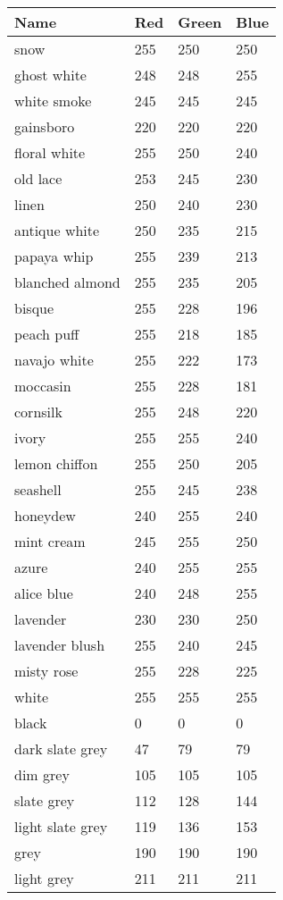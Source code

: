  \begin{center} 
 \begin{tabular}{llll} 
 \toprule 
  Name & Red & Green & Blue  \\ 
 \midrule 
  snow & 255 & 250 & 250  \\
  ghost white & 248 & 248 & 255  \\
  white smoke & 245 & 245 & 245  \\
  gainsboro & 220 & 220 & 220  \\
  floral white & 255 & 250 & 240  \\
  old lace & 253 & 245 & 230  \\
  linen & 250 & 240 & 230  \\
  antique white & 250 & 235 & 215  \\
  papaya whip & 255 & 239 & 213  \\
  blanched almond & 255 & 235 & 205  \\
  bisque & 255 & 228 & 196  \\
  peach puff & 255 & 218 & 185  \\
  navajo white & 255 & 222 & 173  \\
  moccasin & 255 & 228 & 181  \\
  cornsilk & 255 & 248 & 220  \\
  ivory & 255 & 255 & 240  \\
  lemon chiffon & 255 & 250 & 205  \\
  seashell & 255 & 245 & 238  \\
  honeydew & 240 & 255 & 240  \\
  mint cream & 245 & 255 & 250  \\
  azure & 240 & 255 & 255  \\
  alice blue & 240 & 248 & 255  \\
  lavender & 230 & 230 & 250  \\
  lavender blush & 255 & 240 & 245  \\
  misty rose & 255 & 228 & 225  \\
  white & 255 & 255 & 255  \\
  black & 0 & 0 & 0  \\
  dark slate grey & 47 & 79 & 79  \\
  dim grey & 105 & 105 & 105  \\
  slate grey & 112 & 128 & 144  \\
  light slate grey & 119 & 136 & 153  \\
  grey & 190 & 190 & 190  \\
  light grey & 211 & 211 & 211  \\

\end{tabular}
\end{center}
